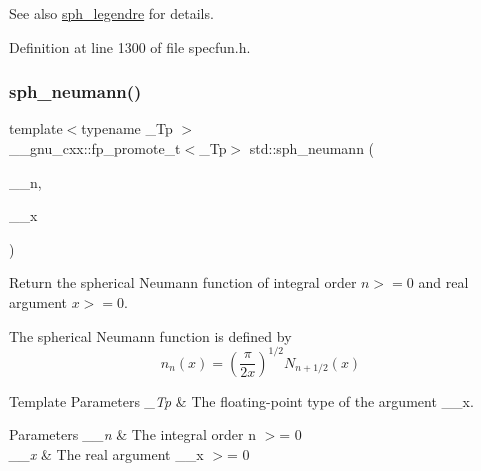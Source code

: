 \begin{DoxySeeAlso}{See also}
\hyperlink{group__tr29124__math__spec__func_gacef0d41a7ce572a9ace3437498794ed0}{sph\+\_\+legendre} for details. 
\end{DoxySeeAlso}


Definition at line 1300 of file specfun.\+h.

\mbox{\label{group__tr29124__math__spec__func_ga01cdd716aaca8ff3c08f307800fd5220}} 
\subsubsection{\texorpdfstring{sph\+\_\+neumann()}{sph\_neumann()}}
{\footnotesize\ttfamily template$<$typename \+\_\+\+Tp $>$ \\
\+\_\+\+\_\+gnu\+\_\+cxx\+::fp\+\_\+promote\+\_\+t$<$\+\_\+\+Tp$>$ std\+::sph\+\_\+neumann (\begin{DoxyParamCaption}\item[{unsigned int}]{\+\_\+\+\_\+n,  }\item[{\+\_\+\+Tp}]{\+\_\+\+\_\+x }\end{DoxyParamCaption})\hspace{0.3cm}{\ttfamily [inline]}}

Return the spherical Neumann function of integral order $ n >= 0 $ and real argument $ x >= 0 $.

The spherical Neumann function is defined by \[ n_n(x) = \left(\frac{\pi}{2x} \right) ^{1/2} N_{n+1/2}(x) \]


\begin{DoxyTemplParams}{Template Parameters}
{\em \+\_\+\+Tp} & The floating-\/point type of the argument {\ttfamily \+\_\+\+\_\+x}. \\
\hline
\end{DoxyTemplParams}

\begin{DoxyParams}{Parameters}
{\em \+\_\+\+\_\+n} & The integral order {\ttfamily  n $>$= 0 } \\
\hline
{\em \+\_\+\+\_\+x} & The real argument {\ttfamily  \+\_\+\+\_\+x $>$= 0 } \\
\hline
\end{DoxyParams}

